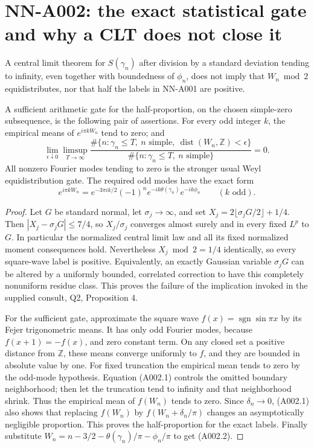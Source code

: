 \section{NN-A002: the exact statistical gate and why a CLT does not close it}
\label{sec:NN-A002}

\begin{theorem}[NN-A002]
A central limit theorem for $S(\gamma_n)$ after division by a standard
deviation tending to infinity, even together with boundedness of
$\phi_n$, does not imply that $W_n\bmod2$ equidistributes, nor that half
the labels in NN-A001 are positive.

A sufficient arithmetic gate for the half-proportion, on the chosen
simple-zero subsequence, is the following pair of assertions.  For every
odd integer $k$, the empirical means of $e^{i\pi kW_n}$ tend to zero;
and
\[
 \lim_{\epsilon\downarrow0}\limsup_{T\to\infty}
 \frac{\#\{n:\gamma_n\leq T,\ n\text{ simple},\
                 \operatorname{dist}(W_n,\mathbb Z)<\epsilon\}}
      {\#\{n:\gamma_n\leq T,\ n\text{ simple}\}}=0.       \tag{A002.1}
\]
All nonzero Fourier modes tending to zero is the stronger usual Weyl
equidistribution gate.  The required odd modes have the exact form
\[
 e^{i\pi kW_n}=e^{-3\pi i k/2}(-1)^n
          e^{-ik\theta(\gamma_n)}e^{-ik\phi_n}\qquad(k\text{ odd}).
                                                               \tag{A002.2}
\]
\end{theorem}

\begin{proof}
Let $G$ be standard normal, let $\sigma_j\to\infty$, and set
$X_j=2\lfloor\sigma_jG/2\rfloor+1/4$.
Then $|X_j-\sigma_jG|\leq7/4$, so $X_j/\sigma_j$ converges almost surely
and in every fixed $L^p$ to $G$.  In particular the normalized central
limit law and all its fixed normalized moment consequences hold.
Nevertheless $X_j\bmod2=1/4$ identically, so every square-wave label is
positive.  Equivalently, an exactly Gaussian variable $\sigma_jG$ can
be altered by a uniformly bounded, correlated correction to have this
completely nonuniform residue class.  This proves the failure of the
implication invoked in the supplied consult, Q2, Proposition 4.

For the sufficient gate, approximate the square wave
$f(x)=\operatorname{sgn}\sin\pi x$ by its Fejer trigonometric means.
It has only odd Fourier modes, because $f(x+1)=-f(x)$, and zero constant
term.  On any closed set a positive distance from $\mathbb Z$, these
means converge uniformly to $f$, and they are bounded in absolute value
by one.  For fixed truncation the empirical mean tends to zero by the
odd-mode hypothesis.  Equation (A002.1) controls the omitted boundary
neighborhood; then let the truncation tend to infinity and that
neighborhood shrink.  Thus the empirical mean of $f(W_n)$ tends to zero.
Since $\delta_n\to0$, (A002.1) also shows that replacing $f(W_n)$ by
$f(W_n+\delta_n/\pi)$ changes an asymptotically negligible proportion.
This proves the half-proportion for the exact labels.  Finally substitute
$W_n=n-3/2-\theta(\gamma_n)/\pi-\phi_n/\pi$ to get (A002.2).
\end{proof}


